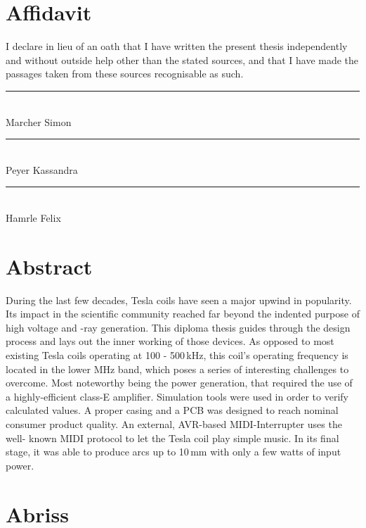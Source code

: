 \chapter*{Affidavit}

I declare in lieu of an oath that I have written the present thesis independently
and without outside help other than the stated sources, and that I have made the
passages taken from these sources recognisable as such.

\vfill

\parbox{\textwidth}{
    \parbox{4cm}{
      \centering
      \rule{4cm}{1pt}\\
       Marcher Simon
    }
    \hfill
    \parbox{4cm}{
      \centering
      \rule{4cm}{1pt}\\
      Peyer Kassandra
    }
    \hfill
    \parbox{4cm}{
      \centering
      \rule{4cm}{1pt}\\
      Hamrle Felix
    }
}

\chapter*{Abstract}

During the last few decades, Tesla coils have seen a major upwind in popularity. Its impact in the scientific community reached far beyond the indented purpose of high voltage and -ray generation. This diploma thesis guides through the design process and lays out the inner working of those devices. As opposed to most existing Tesla coils operating at 100 \hspace{10pt}- 500\,kHz, this coil's operating frequency is located in the lower MHz band, which poses a series of interesting challenges to overcome. Most noteworthy being the power generation, that required the use of a highly-efficient class-E amplifier. Simulation tools were used \hspace{10pt}in order to verify calculated values. A proper casing and a PCB was designed to reach nominal consumer product quality. An external, AVR-based MIDI-Interrupter uses the well- known MIDI protocol to let the Tesla coil play simple music. In its final stage, it was able to produce arcs up to 10\,mm with only a few watts of input power.

\vspace{3cm}

\begingroup
\let\clearpage\relax
\chapter*{Abriss}
\endgroup


